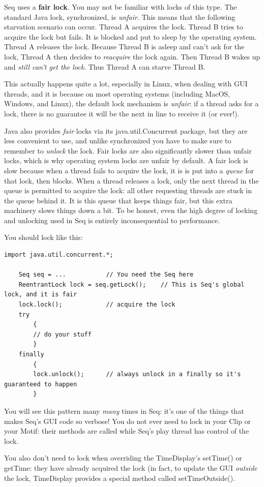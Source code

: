 \documentclass[twoside,10pt]{article}
\begin{document}
Seq uses a {\bf fair lock}.  You may not be familiar with locks of this type.   The standard Java lock, {\sf synchronized}, is {\it unfair}.  This means that the following starvation scenario can occur.  Thread A acquires the lock.  Thread B tries to acquire the lock but fails.  It is blocked and put to sleep by the operating system.  Thread A releases the lock.  Because Thread B is asleep and can't ask for the lock, Thread A then decides to {\it reacquire} the lock again.  Then Thread B wakes up and {\it still can't get the lock}.  Thus Thread A can starve Thread B.

This actually happens quite a lot, especially in Linux, when dealing with GUI threads, and it is because on most operating systems (including MacOS, Windows, and Linux), the default lock mechanism is {\it unfair}: if a thread asks for a lock, there is no guarantee it will be the next in line to receive it (or ever!).

Java also provides {\it fair} locks via its {\sf java.util.Concurrent} package, but they are less convenient to use, and unlike {\sf synchronized} you have to make sure to remember to {\it unlock} the lock.  Fair locks are also significantly slower than unfair locks, which is why operating system locks are unfair by default.  A fair lock is slow because when a thread fails to acquire the lock, it is is put into a {\it queue} for that lock, then blocks.  When a thread releases a lock, only the next thread in the queue is permitted to acquire the lock: all other requesting threads are stuck in the queue behind it.  It is this queue that keeps things fair, but this extra machinery slows things down a bit.  To be honest, even the high degree of locking and unlocking used in Seq is entirely inconsequential to performance. 

You should lock like this:

\begin{verbatim}
import java.util.concurrent.*;

    Seq seq = ...           // You need the Seq here
    ReentrantLock lock = seq.getLock();    // This is Seq's global lock, and it is fair
    lock.lock();            // acquire the lock
    try
        {
        // do your stuff
        }
    finally
        {
        lock.unlock();      // always unlock in a finally so it's guaranteed to happen
        }
\end{verbatim}

You will see this pattern many {\it many} times in Seq: it's one of the things that makes Seq's GUI code so verbose!  You do not ever need to lock in your Clip or your Motif: their methods are called while Seq's play thread has control of the lock.  

You also don't need to lock when overriding the TimeDisplay's {\sf setTime()} or {\sf getTime}: they have already acquired the lock (in fact, to update the GUI {\it outside} the lock, TimeDisplay provides a special method called {\sf setTimeOutside()}.  
\end{document}
